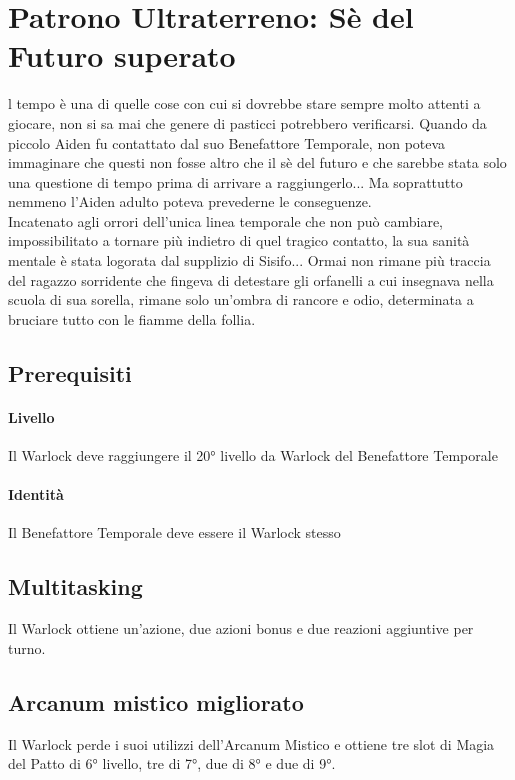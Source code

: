 \section{Patrono Ultraterreno: Sè del Futuro superato}

l tempo è una di quelle cose con cui si dovrebbe stare sempre molto attenti a giocare, non si sa mai che genere di pasticci potrebbero verificarsi. Quando da piccolo Aiden fu contattato dal suo Benefattore Temporale, non poteva immaginare che questi non fosse altro che il sè del futuro e che sarebbe stata solo una questione di tempo prima di arrivare a raggiungerlo... Ma soprattutto nemmeno l'Aiden adulto poteva prevederne le conseguenze.\\
Incatenato agli orrori dell'unica linea temporale che non può cambiare, impossibilitato a tornare più indietro di quel tragico contatto, la sua sanità mentale è stata logorata dal supplizio di Sisifo... Ormai non rimane più traccia del ragazzo sorridente che fingeva di detestare gli orfanelli a cui insegnava nella scuola di sua sorella, rimane solo un'ombra di rancore e odio, determinata a bruciare tutto con le fiamme della follia.

\subsection{Prerequisiti}
\paragraph{Livello} Il Warlock deve raggiungere il 20° livello da Warlock del Benefattore Temporale
\paragraph{Identità} Il Benefattore Temporale deve essere il Warlock stesso

\subsection{Multitasking}
Il Warlock ottiene un'azione, due azioni bonus e due reazioni aggiuntive per turno.

\subsection{Arcanum mistico migliorato}
Il Warlock perde i suoi utilizzi dell'Arcanum Mistico e ottiene tre slot di Magia del Patto di 6° livello, tre di 7°, due di 8° e due di 9°.

